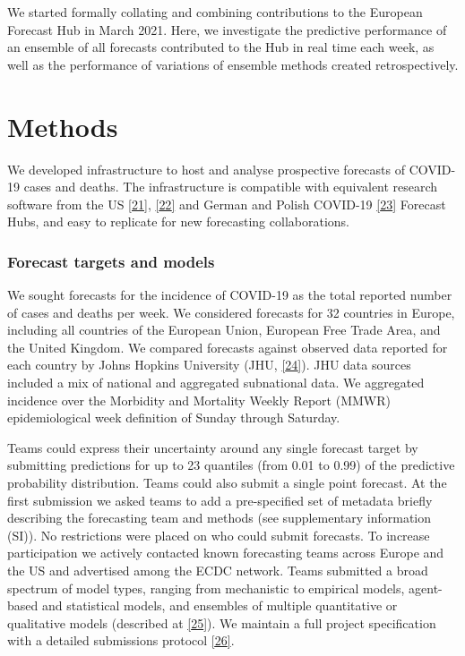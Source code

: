 \documentclass[
]{article}
\begin{document}
We started formally collating and combining contributions to the European Forecast Hub in March 2021. Here, we investigate the predictive performance of an ensemble of all forecasts contributed to the Hub in real time each week, as well as the performance of variations of ensemble methods created retrospectively.

\hypertarget{methods}{%
\section{Methods}\label{methods}}

We developed infrastructure to host and analyse prospective forecasts of COVID-19 cases and deaths. The infrastructure is compatible with equivalent research software from the US \protect\hyperlink{ref-cramerReichlabCovid19forecasthubRelease2021}{{[}21{]}}, \protect\hyperlink{ref-wangReichlabCovidHubUtilsRepository2021}{{[}22{]}} and German and Polish COVID-19 \protect\hyperlink{ref-bracherGermanPolishCOVID192020}{{[}23{]}} Forecast Hubs, and easy to replicate for new forecasting collaborations.

\hypertarget{forecast-targets-and-models}{%
\subsubsection{Forecast targets and models}\label{forecast-targets-and-models}}

We sought forecasts for the incidence of COVID-19 as the total reported number of cases and deaths per week. We considered forecasts for 32 countries in Europe, including all countries of the European Union, European Free Trade Area, and the United Kingdom. We compared forecasts against observed data reported for each country by Johns Hopkins University (JHU, \protect\hyperlink{ref-dongInteractiveWebbasedDashboard2020}{{[}24{]}}). JHU data sources included a mix of national and aggregated subnational data. We aggregated incidence over the Morbidity and Mortality Weekly Report (MMWR) epidemiological week definition of Sunday through Saturday.

Teams could express their uncertainty around any single forecast target by submitting predictions for up to 23 quantiles (from 0.01 to 0.99) of the predictive probability distribution. Teams could also submit a single point forecast. At the first submission we asked teams to add a pre-specified set of metadata briefly describing the forecasting team and methods (see supplementary information (SI)). No restrictions were placed on who could submit forecasts. To increase participation we actively contacted known forecasting teams across Europe and the US and advertised among the ECDC network. Teams submitted a broad spectrum of model types, ranging from mechanistic to empirical models, agent-based and statistical models, and ensembles of multiple quantitative or qualitative models (described at \protect\hyperlink{ref-europeancovid-19forecasthubCommunity}{{[}25{]}}). We maintain a full project specification with a detailed submissions protocol \protect\hyperlink{ref-europeancovid-19forecasthubCovid19forecasthubeuropeWiki}{{[}26{]}}.
\end{document}
